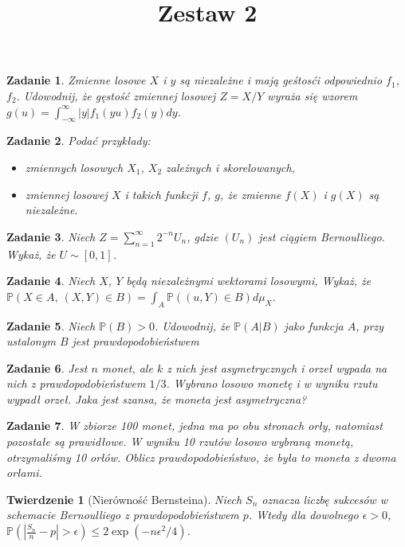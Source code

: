 \documentclass{mwart}
\title{Zestaw 2}
\newtheorem{tw}{Twierdzenie}
\newtheorem{zd}{Zadanie}
\begin{document}

\maketitle

\begin{zd}
Zmienne losowe $X$ i $y$ są niezależne i mają geśtosći odpowiednio $f_1$, $f_2$. Udowodnij, że gęstość zmiennej losowej $Z=X/Y$ wyraża się wzorem $g(u) = \int_{-\infty}^{\infty}|y|f_1(yu)f_2(y)dy$.
\end{zd}

\begin{zd}
Podać przykłady:
\begin{itemize}
\item zmiennych losowych $X_1$, $X_2$ zależnych i skorelowanych,
\item zmiennej losowej $X$ i takich funkcji $f$, $g$, że zmienne $f(X)$ i $g(X)$ są niezależne.
\end{itemize}
\end{zd}

\begin{zd}
Niech $Z=\sum_{n=1}^{\infty}2^{-n}U_n$, gdzie $(U_n)$ jest ciągiem Bernoulliego. Wykaż, że $U\sim [0, 1]$.
\end{zd}

\begin{zd}
Niech $X$, $Y$ będą niezależnymi wektorami losowymi, Wykaż, że $\mathbb{P}\left(X\in A,\ (X, Y)\in B\right) = \int_A\mathbb{P}\left((u, Y)\in B \right)d\mu_X$.
\end{zd}

\begin{zd}
Niech $\mathbb{P}(B) > 0$. Udowodnij, że $\mathbb{P}(A|B)$ jako funkcja $A$, przy ustalonym $B$ jest prawdopodobieństwem
\end{zd}

\begin{zd}
Jest $n$ monet, ale $k$ z nich jest asymetrycznych i orzeł wypada na nich z prawdopodobieństwem $1/3$. Wybrano losowo monetę i w wyniku rzutu wypadł orzeł. Jaka jest szansa, że moneta jest asymetryczna?
\end{zd}

\begin{zd}
W zbiorze 100 monet, jedna ma po obu stronach orły, natomiast pozostałe są prawidłowe. W wyniku 10 rzutów losowo wybraną monetą, otrzymaliśmy 10 orłów. Oblicz prawdopodobieństwo, że była to moneta z dwoma orłami.
\end{zd}

\begin{tw} [Nierówność Bernsteina]
Niech $S_n$ oznacza liczbę sukcesów w schemacie Bernoulliego z prawdopodobieństwem $p$. Wtedy dla dowolnego $\epsilon > 0$, $\mathbb{P}\left(\left|\frac{S_n}{n} -p \right| > \epsilon\right) \leq 2\exp(-n\epsilon^2/4)$.
\end{tw}
\end{document}
